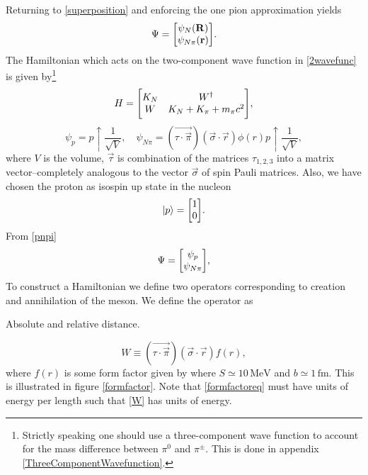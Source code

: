 Returning to \eqref{superposition} and enforcing the one pion approximation yields
\begin{equation} \label{2wavefunc}
	\Psi = \mqty[\psi_{N}(\vec{R})\\
		\psi_{N\pi}(\vec{r})].
\end{equation}
The Hamiltonian which acts on the two-component wave function in \eqref{2wavefunc} is given by\footnote{Strictly speaking one should use a three-component wave function to account for the mass difference between $\pi^0$ and $\pi^\pm$. This is done in appendix \ref{ThreeComponentWavefunction}.}
\begin{equation}
	H  =  \mqty[K_N & W^\dagger \\ W & K_N+K_\pi+m_\pi c^2],
\end{equation}
\begin{equation}\label{pnpi}
    \psi_p = p\uparrow\frac{1}{\sqrt{V}}, \quad \psi_{N\pi}=(\vec{\tau\cdot\vec{\pi}})(\vec{\sigma}\cdot\vec{r})\phi(r)p\uparrow\frac{1}{\sqrt{V}},
\end{equation}
where $V$ is the volume, $\vec{\tau}$ is combination of the matrices $\tau_{1,2,3}$ into a matrix vector--completely analogous to the vector $\vec{\sigma}$ of spin Pauli matrices. Also, we have chosen the proton as isospin up state in the nucleon
\begin{equation}
    \ket{p} = \mqty[1 \\ 0].
\end{equation}
From \eqref{pnpi}
\begin{equation} \label{wavefunc}
    \Psi = \mqty[\psi_p \\ \psi_{N\pi}],
\end{equation}
To construct a Hamiltonian we define two operators corresponding to creation and annihilation of the meson. We define the operator as 
\begin{marginfigure}
\centering

\caption{Absolute and relative distance.}
\label{relativecoordinate}
\end{marginfigure}
\begin{equation} \label{W}
    W \equiv (\vec{\tau\cdot\vec{\pi}})(\vec{\sigma}\cdot\vec{r})f(r),
\end{equation}
where $f(r)$ is some form factor given by
where $S\simeq 10 \, \text{MeV}$  and $b\simeq 1 \, \text{fm}$. This is illustrated in figure \ref{formfactor}. Note that \eqref{formfactoreq} must have units of energy per length such that \eqref{W} has units of energy. 

